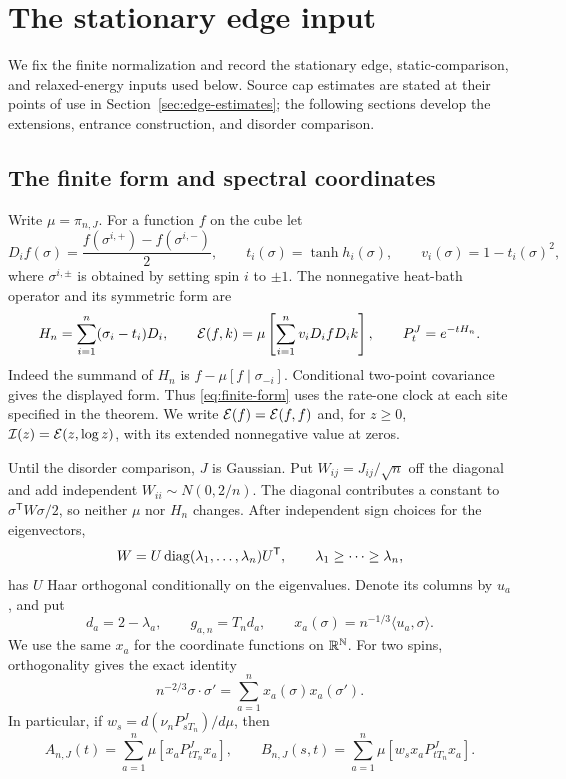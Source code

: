 \section{The stationary edge input}\label{sec:background}

We fix the finite normalization and record the stationary edge,
static-comparison, and relaxed-energy inputs used below. Source cap
estimates are stated at their points of use in
Section~\ref{sec:edge-estimates}; the following sections develop the
extensions, entrance construction, and disorder comparison.

\subsection{The finite form and spectral coordinates}

Write \(\mu=\pi_{n,J}\). For a function \(f\) on the cube let
\[
 D_i f(\sigma)=\frac{f(\sigma^{i,+})-f(\sigma^{i,-})}{2},
 \qquad
 t_i(\sigma)=\tanh h_i(\sigma),\qquad
 v_i(\sigma)=1-t_i(\sigma)^2,
\]
where \(\sigma^{i,\pm}\) is obtained by setting spin \(i\) to \(\pm1\).
The nonnegative heat-bath operator and its symmetric form are
\begin{equation}\label{eq:finite-form}
 H_n=\sum_{i=1}^n(\sigma_i-t_i)D_i,\qquad
 \mathcal E(f,k)=\mu\left[\sum_{i=1}^n v_iD_ifD_ik\right],
 \qquad P_t^J=e^{-tH_n}.
\end{equation}
Indeed the summand of \(H_n\) is \(f-\mu[f\mid\sigma_{-i}]\).
Conditional two-point covariance gives the displayed form. Thus
\eqref{eq:finite-form} uses the rate-one clock at each site specified
in the theorem. We write \(\mathcal E(f)=\mathcal E(f,f)\) and, for \(z\ge0\),
\(\mathcal I(z)=\mathcal E(z,\log z)\), with its extended nonnegative value at zeros.

Until the disorder comparison, \(J\) is Gaussian. Put
\(W_{ij}=J_{ij}/\sqrt n\) off the diagonal and add independent
\(W_{ii}\sim N(0,2/n)\). The diagonal contributes a constant to
\(\sigma^{\mathsf T}W\sigma/2\), so neither \(\mu\) nor \(H_n\) changes.
After independent sign choices for the eigenvectors,
\[
 W=U\operatorname{diag}(\lambda_1,\ldots,\lambda_n)U^{\mathsf T},\qquad
 \lambda_1\ge\cdots\ge\lambda_n,
\]
has \(U\) Haar orthogonal conditionally on the eigenvalues. Denote its
columns by \(u_a\), and put
\begin{equation}\label{eq:finite-edge}
 d_a=2-\lambda_a,\qquad g_{a,n}=T_n d_a,\qquad
 x_a(\sigma)=n^{-1/3}\langle u_a,\sigma\rangle .
\end{equation}
We use the same \(x_a\) for the coordinate functions on \(\mathbb R^\mathbb N\).
For two spins, orthogonality gives the exact identity
\begin{equation}\label{eq:replica-identity}
 n^{-2/3}\sigma\cdot\sigma'
       =\sum_{a=1}^n x_a(\sigma)x_a(\sigma').
\end{equation}
In particular, if
\(w_s=d(\nu_nP_{sT_n}^J)/d\mu\), then
\begin{equation}\label{eq:finite-spectral-traces}
 A_{n,J}(t)=\sum_{a=1}^n\mu[x_aP_{tT_n}^Jx_a],
 \qquad
 B_{n,J}(s,t)=\sum_{a=1}^n\mu[w_sx_aP_{tT_n}^Jx_a].
\end{equation}

